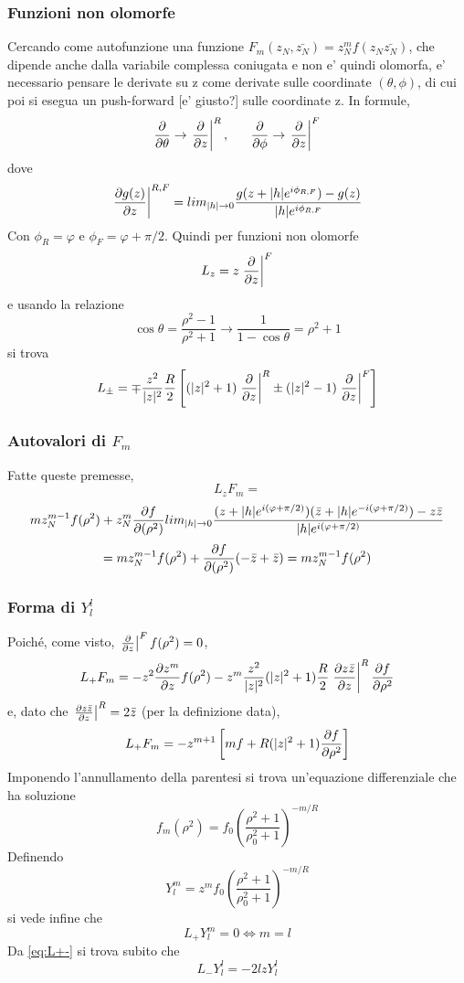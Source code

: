 \subsubsection*{Funzioni non olomorfe}
Cercando come autofunzione una funzione \( F_m(z_N,\bar{z_N}) = z_N^m f(z_N\bar{z_N}) \), che dipende anche dalla variabile complessa coniugata e non e' quindi olomorfa, e' necessario pensare le derivate su z come derivate sulle coordinate $(\theta,\phi)$, di cui poi si esegua un push-forward [\todo e' giusto?] sulle coordinate z. In formule,
\[ \frac{\partial }{\partial \theta} \rightarrow \left.\frac{\partial }{\partial z}\right|^R ,\;\;\;\;\;\; \frac{\partial }{\partial \phi} \rightarrow \left.\frac{\partial }{\partial z}\right|^F \]
dove
\[ \left.\frac{\partial g(z)}{\partial z}\right|^{R,F} = lim_{|h|\rightarrow 0} \frac{g(z+|h|e^{i\phi_{R,F}}) - g(z)}{|h|e^{i\phi_{R,F}}} \]
Con \( \phi_R = \varphi \) e \( \phi_F = \varphi+\pi/2 \).
Quindi per funzioni non olomorfe
\[ L_z = z\left.\frac{\partial }{\partial z}\right|^F \]
e usando la relazione
\[ \cos\theta = \frac{\rho^2 - 1}{\rho^2 +1} \rightarrow \frac{1}{1-\cos\theta} = \rho^2 +1\]
si trova
\begin{equation} \label{eq:L+-}
 L_\pm = \mp \frac{z^2}{|z|^2}\frac{R}{2} \left[ (|z|^2+1)\left.\frac{\partial }{\partial z}\right|^R \pm (|z|^2-1)\left.\frac{\partial }{\partial z}\right|^F     \right]
\end{equation}

\subsubsection*{Autovalori di $F_m$}
Fatte queste premesse,
\[ L_z F_m = \]
\[mz_N^{m-1}f(\rho^2) + z_N^m \frac{\partial f}{\partial (\rho^2)} lim_{|h|\rightarrow 0} \frac{(z+|h|e^{i(\varphi+\pi/2)})(\bar{z}+|h|e^{-i(\varphi+\pi/2)})-z\bar{z}}{|h|e^{i(\varphi+\pi/2)}} \]
\[= mz_N^{m-1}f(\rho^2) + \frac{\partial f}{\partial (\rho^2)}(-\bar{z}+\bar{z}) = mz_N^{m-1}f(\rho^2)\]

\subsubsection*{Forma di $Y_l^l$}
Poich\'e, come visto, \(\left.\frac{\partial }{\partial z}\right|^F f(\rho^2) = 0\),
\[ L_+F_m = -z^2\frac{\partial z^m}{\partial z}f(\rho^2) - z^m \frac{z^2}{|z|^2} (|z|^2+1) \frac{R}{2} \left.\frac{\partial z\bar{z}}{\partial z}\right|^R \frac{\partial f}{\partial \rho^2} \]
e, dato che \( \left.\frac{\partial z\bar{z}}{\partial z}\right|^R = 2\bar{z} \) (per la definizione data),
\[ L_+F_m = -z^{m+1} \left[ mf + R(|z|^2+1) \frac{\partial f}{\partial \rho^2}   \right] \]
Imponendo l'annullamento della parentesi si trova un'equazione differenziale che ha soluzione
\[ f_m (\rho^2) = f_0\left(\frac{\rho^2 +1}{\rho_0^2+1}\right)^{-m/R} \]
Definendo 
\[ Y_l^m = z^m f_0\left(\frac{\rho^2 +1}{\rho_0^2+1}\right)^{-m/R}  \]
si vede infine che 
\[ L_+Y^m_l = 0 \iff m=l \]
Da \ref{eq:L+-} si trova subito che 
\[ L_-Y_l^l = -2lzY_l^l\]

